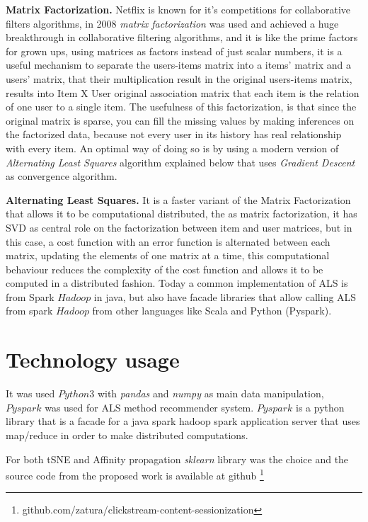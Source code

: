 \documentclass[ecp,tc,english]{iiufrgs}
\begin{document}
    \textbf{Matrix Factorization.} Netflix is known for it's competitions for collaborative filters algorithms, in 2008 \textit{matrix factorization} \cite{srebro2004} was used and achieved a huge breakthrough in collaborative filtering algorithms, and it is like the prime factors for grown ups, using matrices as factors instead of just scalar numbers, it is a useful mechanism to separate the users-items matrix into a items' matrix and a users' matrix, that their multiplication result in the original users-items matrix, results into Item X User original association matrix that each item is the relation of one user to a single item.
    The usefulness of this factorization, is that since the original matrix is sparse, you can fill the missing values by making inferences on the factorized data, because not every user in its history has real relationship with every item.
    An optimal way of doing so is by using a modern version of \textit{Alternating Least Squares} algorithm \cite{takane1977} explained below that uses \textit{Gradient Descent} as convergence algorithm.
    
    
    \textbf{Alternating Least Squares.} It is a faster variant of the Matrix Factorization that allows it to be computational distributed, the as matrix factorization, it has SVD \cite{golub1971} as central role on the factorization between item and user matrices, but in this case, a cost function with an error function is alternated between each matrix, updating the elements of one matrix at a time, this computational behaviour reduces the complexity of the cost function and allows it to be computed in a distributed fashion.
    Today a common implementation of ALS is from Spark \(Hadoop\) in java, but also have facade libraries that allow calling ALS from spark \(Hadoop\) from other languages like Scala and Python (Pyspark).

    \section{Technology usage} \label{technology_usage}

    It was used \(Python3\) with \textit{pandas} \cite{reback2020pandas} and \textit{numpy} as main data manipulation, \(Pyspark\) was used for ALS method recommender system. 
    \(Pyspark\) is a python library that is a facade for a java spark hadoop spark application server that uses map/reduce in order to make distributed computations.

    For both tSNE and Affinity propagation \textit{sklearn} library was the choice and the source code from the proposed work is available at github \footnote{github.com/zatura/clickstream-content-sessionization}
        
\end{document}
